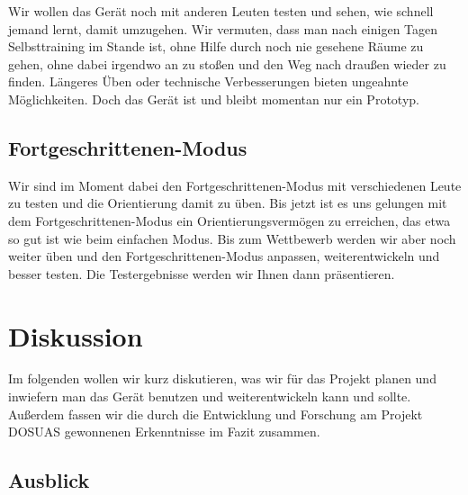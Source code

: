 \documentclass[a4paper,12pt,ngerman]{scrartcl}
\begin{document}
Wir wollen das Gerät noch mit
anderen Leuten testen und sehen, wie schnell jemand lernt, damit umzugehen. Wir vermuten, dass man nach einigen 
Tagen Selbsttraining im Stande ist, ohne Hilfe durch noch nie gesehene Räume zu gehen, ohne dabei irgendwo an zu
stoßen und den Weg nach draußen wieder zu finden. Längeres Üben oder technische Verbesserungen bieten ungeahnte
Möglichkeiten. Doch das Gerät ist und bleibt momentan nur ein Prototyp. 

\subsection{Fortgeschrittenen-Modus}

Wir sind im Moment dabei den Fortgeschrittenen-Modus mit verschiedenen Leute zu testen und die Orientierung damit zu üben. Bis jetzt
ist es uns gelungen mit dem Fortgeschrittenen-Modus ein Orientierungsvermögen zu erreichen, das etwa so gut ist wie beim einfachen
Modus. Bis zum Wettbewerb werden wir aber noch weiter üben und den Fortgeschrittenen-Modus anpassen, weiterentwickeln und besser testen.
Die Testergebnisse werden wir Ihnen dann präsentieren.

\newpage

\section{Diskussion}

Im folgenden wollen wir kurz diskutieren, was wir für das Projekt planen und inwiefern man das
Gerät benutzen und weiterentwickeln kann und sollte. Außerdem fassen wir die durch die Entwicklung und Forschung am Projekt DOSUAS gewonnenen Erkenntnisse im Fazit zusammen.

\subsection{Ausblick}
\end{document}

